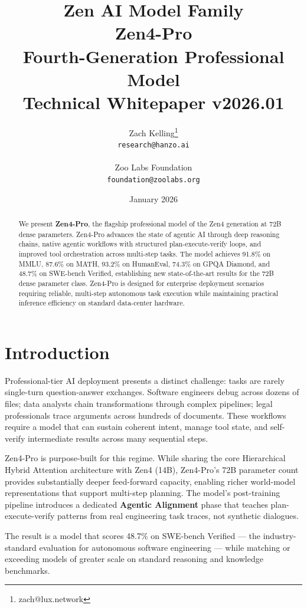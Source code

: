 \documentclass[11pt,a4paper]{article}
\title{
    \vspace{-2cm}
    \Large \textbf{Zen AI Model Family} \\
    \vspace{0.5cm}
    \Huge \textbf{Zen4-Pro} \\
    \vspace{0.3cm}
    \large Fourth-Generation Professional Model \\
    \vspace{0.5cm}
    \normalsize Technical Whitepaper v2026.01
}
\author{
    Zach Kelling\thanks{zach@lux.network} \\
    \texttt{research@hanzo.ai} \\
    \\
    Zoo Labs Foundation \\
    \texttt{foundation@zoolabs.org}
}
\date{January 2026}
\begin{document}
\maketitle

\begin{abstract}
We present \textbf{Zen4-Pro}, the flagship professional model of the Zen4 generation at 72B dense
parameters. Zen4-Pro advances the state of agentic AI through deep reasoning chains, native
agentic workflows with structured plan-execute-verify loops, and improved tool orchestration
across multi-step tasks. The model achieves 91.8\% on MMLU, 87.6\% on MATH, 93.2\% on
HumanEval, 74.3\% on GPQA Diamond, and 48.7\% on SWE-bench Verified, establishing new
state-of-the-art results for the 72B dense parameter class. Zen4-Pro is designed for
enterprise deployment scenarios requiring reliable, multi-step autonomous task execution
while maintaining practical inference efficiency on standard data-center hardware.
\end{abstract}

\tableofcontents
\newpage

\section{Introduction}

Professional-tier AI deployment presents a distinct challenge: tasks are rarely single-turn
question-answer exchanges. Software engineers debug across dozens of files; data analysts chain
transformations through complex pipelines; legal professionals trace arguments across hundreds
of documents. These workflows require a model that can sustain coherent intent, manage tool
state, and self-verify intermediate results across many sequential steps.

Zen4-Pro is purpose-built for this regime. While sharing the core Hierarchical Hybrid Attention
architecture with Zen4 (14B), Zen4-Pro's 72B parameter count provides substantially deeper
feed-forward capacity, enabling richer world-model representations that support multi-step
planning. The model's post-training pipeline introduces a dedicated \textbf{Agentic Alignment}
phase that teaches plan-execute-verify patterns from real engineering task traces, not synthetic
dialogues.

The result is a model that scores 48.7\% on SWE-bench Verified --- the industry-standard
evaluation for autonomous software engineering --- while matching or exceeding models of greater
scale on standard reasoning and knowledge benchmarks.
\end{document}
